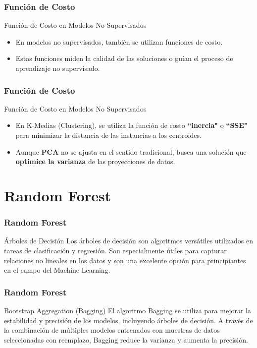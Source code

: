 \documentclass{beamer}
\begin{document}
\begin{frame}
	\frametitle{Función de Costo}
			\begin{block}{Función de Costo en Modelos No Supervisados}	
	\begin{itemize}
		\item En modelos no supervisados, también se utilizan funciones de costo.
		\item Estas funciones miden la calidad de las soluciones o guían el proceso de aprendizaje no supervisado.
	\end{itemize}
		\end{block}
\end{frame}

\begin{frame}
	\frametitle{Función de Costo}
		\begin{block}{Función de Costo en Modelos No Supervisados}	
	\begin{itemize}
		\item En K-Medias (Clustering), se utiliza la función de costo \textbf{``inercia"} o \textbf{``SSE"} para minimizar la distancia de las instancias a los centroides.
			\item Aunque \textbf{PCA} no se ajusta en el sentido tradicional, busca una solución que\textbf{ optimice la varianza }de las proyecciones de datos.
	\end{itemize}
	\end{block}
\end{frame}

\section{Random Forest}

\begin{frame}
    \frametitle{Random Forest}
\begin{block}{Árboles de Decisión}
      Los árboles de decisión son algoritmos versátiles utilizados en tareas de clasificación y regresión. Son especialmente útiles para capturar relaciones no lineales en los datos y son una excelente opción para principiantes en el campo del Machine Learning.
\end{block}
  

\end{frame}

\begin{frame}
\frametitle{Random Forest}
  \begin{block}{Bootstrap Aggregation (Bagging)}
      El algoritmo Bagging se utiliza para mejorar la estabilidad y precisión de los modelos, incluyendo árboles de decisión. A través de la combinación de múltiples modelos entrenados con muestras de datos seleccionadas con reemplazo, Bagging reduce la varianza y aumenta la precisión.
  \end{block} 
  
\end{frame}
\end{document}
